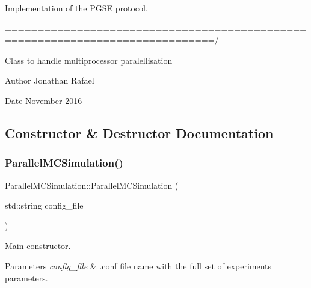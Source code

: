 Implementation of the P\+G\+SE protocol.

==============================================================================/

Class to handle multiprocessor paralellisation \begin{DoxyAuthor}{Author}
Jonathan Rafael 
\end{DoxyAuthor}
\begin{DoxyDate}{Date}
November 2016 

 
\end{DoxyDate}


\subsection{Constructor \& Destructor Documentation}
\mbox{\label{class_parallel_m_c_simulation_ac85dc215688a1462b770d20c2ff10b3f}} 
\subsubsection{\texorpdfstring{Parallel\+M\+C\+Simulation()}{ParallelMCSimulation()}\hspace{0.1cm}{\footnotesize\ttfamily [1/2]}}
{\footnotesize\ttfamily Parallel\+M\+C\+Simulation\+::\+Parallel\+M\+C\+Simulation (\begin{DoxyParamCaption}\item[{std\+::string}]{config\+\_\+file }\end{DoxyParamCaption})}



Main constructor. 


\begin{DoxyParams}{Parameters}
{\em config\+\_\+file} & .conf file name with the full set of experiments parameters. \\
\hline
\end{DoxyParams}
\mbox{\label{class_parallel_m_c_simulation_a32ee405791787a1ea9d03895fdd810f4}} 
